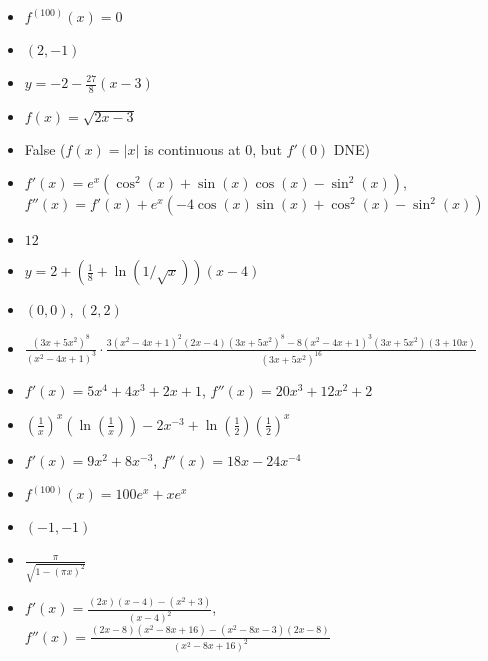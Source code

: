 \documentclass{article}
\begin{document}
\begin{itemize}
\item $f^{(100)}(x)=0$
\item $(2,-1)$
\item $y=-2-\frac{27}{8}(x-3)$
\item $f(x)=\sqrt{2x-3}$
\item False ($f(x)=|x|$ is continuous at $0$, but $f'(0)$ DNE)
\item $f'(x)=e^{x}(\cos^{2}(x)+\sin(x)\cos(x)-\sin^{2}(x))$, \\$f''(x)=f'(x)+e^{x}\left(-4\cos\left(x\right)\sin\left(x\right)+\cos^{2}\left(x\right)-\sin^{2}\left(x\right)\right)$
\item $12$
\item $y=2+\left(\frac18+\ln(1/\sqrt{x})\right)(x-4)$
\item $(0,0)$, $(2,2)$
\item $\frac{(3x+5x^2)^8}{(x^2-4x+1)^3}\cdot\frac{3(x^2-4x+1)^2(2x-4)(3x+5x^2)^8-8(x^2-4x+1)^3(3x+5x^2)(3+10x)}{(3x+5x^2)^{16}}$
\item $f'(x)=5x^4+4x^3+2x+1$, $f''(x)=20x^3+12x^2+2$
\item $\left(\frac{1}{x}\right)^x\left(\ln\left(\frac{1}{x}\right)\right)-2x^{-3}+\ln\left(\frac12\right)\left(\frac12\right)^x$
\item $f'(x)=9x^2+8x^{-3}$, $f''(x)=18x-24x^{-4}$
\item $f^{(100)}(x)=100e^x+xe^x$
\item $(-1,-1)$
\item $\frac{\pi}{\sqrt{1-(\pi x)^2}}$
\item $f'(x)=\frac{(2x)(x-4)-(x^2+3)}{(x-4)^2}$, $f''(x)=\frac{(2x-8)(x^2-8x+16)-(x^2-8x-3)(2x-8)}{(x^2-8x+16)^2}$
\end{itemize}
\end{document}
